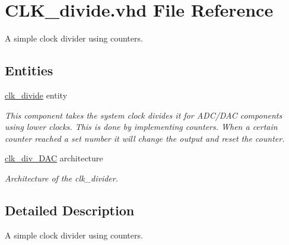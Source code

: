 \hypertarget{CLK__divide_8vhd}{\section{C\-L\-K\-\_\-divide.\-vhd File Reference}
\label{CLK__divide_8vhd}
}


A simple clock divider using counters.  


\subsection*{Entities}
\begin{DoxyCompactItemize}
\item 
\hyperlink{classclk__divide}{clk\-\_\-divide} entity
\begin{DoxyCompactList}\small\item\em This component takes the system clock divides it for A\-D\-C/\-D\-A\-C components using lower clocks. This is done by implementing counters. When a certain counter reached a set number it will change the output and reset the counter. \end{DoxyCompactList}\item 
\hyperlink{classclk__divide_1_1clk__div__DAC}{clk\-\_\-div\-\_\-\-D\-A\-C} architecture
\begin{DoxyCompactList}\small\item\em Architecture of the clk\-\_\-divider. \end{DoxyCompactList}\end{DoxyCompactItemize}


\subsection{Detailed Description}
A simple clock divider using counters. 